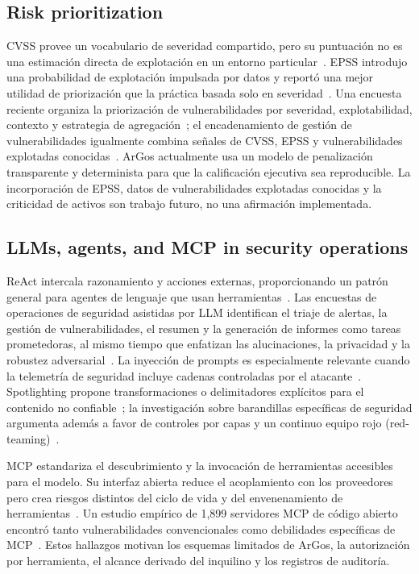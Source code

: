 \documentclass[conference,a4paper]{IEEEtran}
\newcommand{\argos}{ArGos\xspace}
\begin{document}
\subsection{Risk prioritization}

CVSS provee un vocabulario de severidad compartido, pero su puntuación no es una estimación directa de explotación en un entorno particular~\cite{Mell2006CVSS,Scarfone2009CVSS}. EPSS introdujo una probabilidad de explotación impulsada por datos y reportó una mejor utilidad de priorización que la práctica basada solo en severidad~\cite{Jacobs2021EPSS}. Una encuesta reciente organiza la priorización de vulnerabilidades por severidad, explotabilidad, contexto y estrategia de agregación~\cite{Jiang2025Prioritization}; el encadenamiento de gestión de vulnerabilidades igualmente combina señales de CVSS, EPSS y vulnerabilidades explotadas conocidas~\cite{Shimizu2025Chaining}. \argos actualmente usa un modelo de penalización transparente y determinista para que la calificación ejecutiva sea reproducible. La incorporación de EPSS, datos de vulnerabilidades explotadas conocidas y la criticidad de activos son trabajo futuro, no una afirmación implementada.

\subsection{LLMs, agents, and MCP in security operations}

ReAct intercala razonamiento y acciones externas, proporcionando un patrón general para agentes de lenguaje que usan herramientas~\cite{Yao2023ReAct}. Las encuestas de operaciones de seguridad asistidas por LLM identifican el triaje de alertas, la gestión de vulnerabilidades, el resumen y la generación de informes como tareas prometedoras, al mismo tiempo que enfatizan las alucinaciones, la privacidad y la robustez adversarial~\cite{Habibzadeh2025LLMSOC,Srinivas2025AISOC}. La inyección de prompts es especialmente relevante cuando la telemetría de seguridad incluye cadenas controladas por el atacante~\cite{Greshake2023Indirect}. Spotlighting propone transformaciones o delimitadores explícitos para el contenido no confiable~\cite{Hines2024Spotlighting}; la investigación sobre barandillas específicas de seguridad argumenta además a favor de controles por capas y un continuo equipo rojo (red-teaming)~\cite{Ali2026SecureCAI}.

MCP estandariza el descubrimiento y la invocación de herramientas accesibles para el modelo. Su interfaz abierta reduce el acoplamiento con los proveedores pero crea riesgos distintos del ciclo de vida y del envenenamiento de herramientas~\cite{Hou2025MCP}. Un estudio empírico de 1,899 servidores MCP de código abierto encontró tanto vulnerabilidades convencionales como debilidades específicas de MCP~\cite{Hasan2026MCP}. Estos hallazgos motivan los esquemas limitados de \argos, la autorización por herramienta, el alcance derivado del inquilino y los registros de auditoría.
\end{document}

